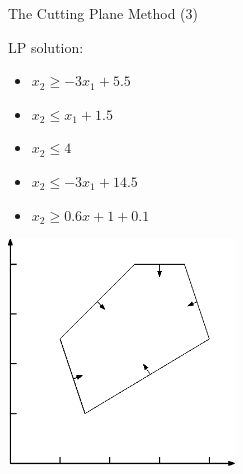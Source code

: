 \documentclass[10pt]{beamer}
\begin{document}
\begin{frame}[t]{The Cutting Plane Method (3)}
        \begin{minipage}[t]{0.48\textwidth}
            LP solution:        
            \begin{itemize}
                \item $ x_2 \geq -3x_1 + 5.5 $
                \item $ x_2 \leq x_1 + 1.5 $
                \item $ x_2 \leq 4$
                \item $ x_2 \leq -3x_1 + 14.5 $
                \item $ x_2 \geq 0.6x+1 + 0.1 $
            \end{itemize}
        \end{minipage}
        \begin{minipage}[t]{0.48\textwidth}
            \begin{center}
                \includegraphics[width=6cm]{cutting_plane005.eps} 
            \end{center}
        \end{minipage}        
\end{frame}
\end{document}
